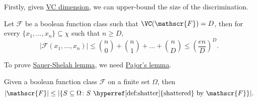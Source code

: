 Firstly, given \hyperref[def:VC-dimension]{VC dimension}, we can upper-bound the size of the discrimination.

\begin{lemma}\label{lma:Sauer-Shelah}
  Let \(\mathscr{F} \) be a boolean function class such that \(\VC(\mathscr{F}) = D\), then for every \(\{ x_1, \dots , x_n \} \subseteq \chi \) such that \(n \geq D\),
  \[
    \vert \mathscr{F} (x_1, \dots , x_n) \vert
    \leq \binom{n}{0} + \binom{n}{1} + \dots + \binom{n}{D}
    \leq \left( \frac{en}{D} \right) ^D.
  \]
\end{lemma}

To prove \hyperref[lma:Sauer-Shelah]{Sauer-Shelah lemma}, we need \hyperref[lma:Pajor]{Pajor's lemma}.

\begin{lemma}\label{lma:Pajor}
  Given a boolean function class \(\mathscr{F} \) on a finite set \(\Omega \), then
  \[
    \vert \mathscr{F} \vert \leq \vert \{ S \subseteq \Omega \colon S \text{ \hyperref[def:shatter]{shattered} by } \mathscr{F} \} \vert.
  \]
\end{lemma}
